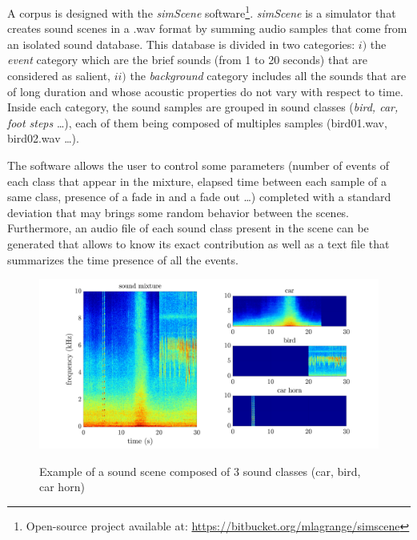\documentclass[twocolumn,a4paper,10pt]{article}
\begin{document}
A corpus is designed with the \textit{simScene} software\footnote{Open-source project available at: \url{https://bitbucket.org/mlagrange/simscene}}. \textit{simScene} \cite{rossignol_simscene:_2015} is a simulator that creates sound scenes in a .wav format by summing audio samples that come from an isolated sound database. This database is divided in two categories: $i)$ the \textit{event} category which are the brief sounds (from 1 to 20 seconds) that are considered as salient, $ii)$ the \textit{background} category includes all the sounds that are of long duration and whose acoustic properties do not vary with respect to time. Inside each category, the sound samples are grouped in sound classes (\textit{bird, car, foot steps} \dots), each of them being composed of multiples samples (bird01.wav, bird02.wav \dots).

The software allows the user to control some parameters (number of events of each class that appear in the mixture, elapsed time between each sample of a same class, presence of a fade in and a fade out \dots) completed with a standard deviation that may brings some random behavior between the scenes. Furthermore, an audio file of each sound class present in the scene can be generated that allows to know its exact contribution as well as a text file that summarizes the time presence of all the events.\\

\begin{figure}[h]
\centering
\includegraphics[width=\linewidth]{../image/exampleSimScene2.pdf}
\label{fig:exampleSimScene}
\caption{Example of a sound scene composed of 3 sound classes (car, bird, car horn)}
\end{figure}
\end{document}

